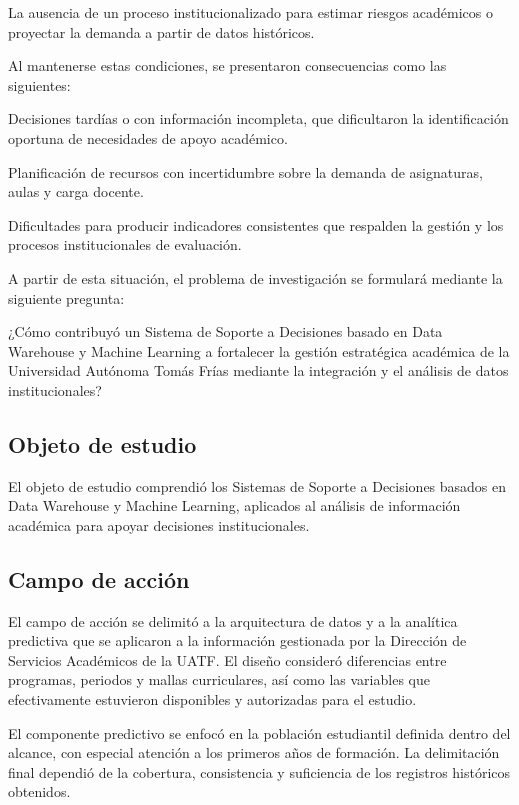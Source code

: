 \documentclass[11pt,oneside,openany]{book}
\begin{document}
La ausencia de un proceso institucionalizado para estimar riesgos académicos o proyectar la demanda a partir de datos históricos.

Al mantenerse estas condiciones, se presentaron consecuencias como las siguientes:

Decisiones tardías o con información incompleta, que dificultaron la identificación oportuna de necesidades de apoyo académico.

Planificación de recursos con incertidumbre sobre la demanda de asignaturas, aulas y carga docente.

Dificultades para producir indicadores consistentes que respalden la gestión y los procesos institucionales de evaluación.

A partir de esta situación, el problema de investigación se formulará mediante la siguiente pregunta:

¿Cómo contribuyó un Sistema de Soporte a Decisiones basado en Data Warehouse y Machine Learning a fortalecer la gestión estratégica académica de la Universidad Autónoma Tomás Frías mediante la integración y el análisis de datos institucionales?

\subsection*{Objeto de estudio}

El objeto de estudio comprendió los Sistemas de Soporte a Decisiones basados en Data Warehouse y Machine Learning, aplicados al análisis de información académica para apoyar decisiones institucionales.

\subsection*{Campo de acción}

El campo de acción se delimitó a la arquitectura de datos y a la analítica predictiva que se aplicaron a la información gestionada por la Dirección de Servicios Académicos de la UATF. El diseño consideró diferencias entre programas, periodos y mallas curriculares, así como las variables que efectivamente estuvieron disponibles y autorizadas para el estudio.

El componente predictivo se enfocó en la población estudiantil definida dentro del alcance, con especial atención a los primeros años de formación. La delimitación final dependió de la cobertura, consistencia y suficiencia de los registros históricos obtenidos.
\end{document}
